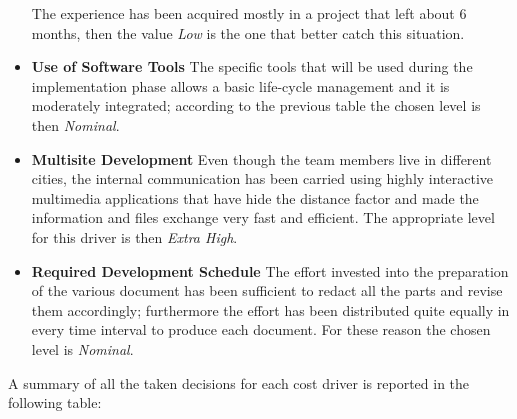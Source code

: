 \documentclass[11pt,a4paper]{report}
\begin{document}
\begin{itemize}
The experience has been acquired mostly in a project that left about 6 months, then the value \textit{Low} is the one that better catch this situation. 
	\item \textbf{Use of Software Tools}
The specific tools that will be used during the implementation phase allows a basic life-cycle management and it is moderately integrated; according to the previous table the chosen level is then \textit{Nominal}.
\newpage
	\item \textbf{Multisite Development}
Even though the team members live in different cities, the internal communication has been carried using highly interactive multimedia applications that have hide the distance factor and made the information and files exchange very fast and efficient. The appropriate level for this driver is then \textit{Extra High}.
	\item \textbf{Required Development Schedule}
The effort invested into the preparation of the various document has been sufficient to redact all the parts and revise them accordingly; furthermore the effort has been distributed quite equally in every time interval to produce each document. For these reason the chosen level is \textit{Nominal}.
\end{itemize}
\newpage
\noindent A summary of all the taken decisions for each cost driver is reported in the following table:\\
\\
\end{document}

